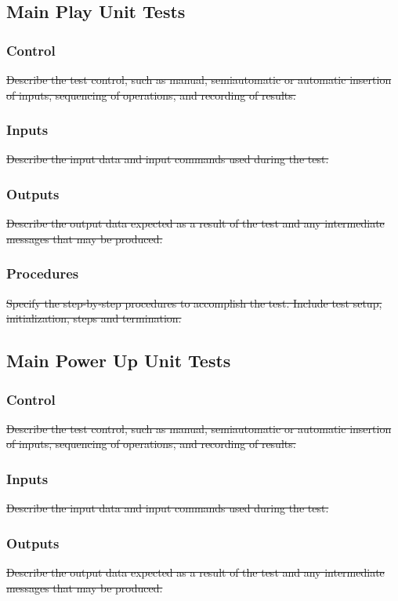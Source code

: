 \documentclass[11pt, oneside]{article}   	%
\begin{document}
\subsection{Main Play Unit Tests}
\subsubsection{Control}
\sout{Describe the test control, such as manual, semiautomatic or automatic insertion of inputs, sequencing of operations, and recording of results.}

\subsubsection{Inputs}
\sout{Describe the input data and input commands used during the test.}

\subsubsection{Outputs}
\sout{Describe the output data expected as a result of the test and any intermediate messages that may be produced.}

\subsubsection{Procedures}
\sout{Specify the step-by-step procedures to accomplish the test. Include test setup, initialization, steps and termination.}

\subsection{{Main Power Up Unit Tests}}
\subsubsection{Control}
\sout{Describe the test control, such as manual, semiautomatic or automatic insertion of inputs, sequencing of operations, and recording of results.}

\subsubsection{Inputs}
\sout{Describe the input data and input commands used during the test.}

\subsubsection{Outputs}
\sout{Describe the output data expected as a result of the test and any intermediate messages that may be produced.}
\end{document}

